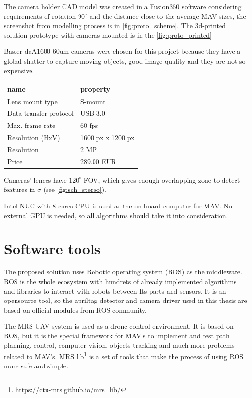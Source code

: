 The camera holder CAD model was created in a Fusion360 software considering requirements of rotation $90^\circ$ and the distance close to the average MAV sizes, the screenshot from modelling process is in \autoref{fig:proto_scheme}.
The 3d-printed solution prototype with cameras mounted is in the \autoref{fig:proto_printed}

Basler daA1600-60um cameras were chosen for this project because they have a global shutter to capture moving objects, good image quality and they are not so expensive.
\begin{center}
    \begin{tabular}{ l l }
    \hline
    name                   & property          \\ \hline
    Lens mount type        & S-mount           \\
    Data transfer protocol & USB 3.0           \\
    Max. frame rate        & 60 fps            \\
    Resolution (HxV)       & 1600 px x 1200 px \\
    Resolution             & 2 MP              \\
    Price                  & 289.00 EUR        \\ \hline
    \end{tabular}
\end{center}

Cameras' lences have $120^\circ$ FOV, which gives enough overlapping zone to detect features in $\sigma$ (see \autoref{fig:sch_stereo}).

Intel NUC with 8 cores CPU is used as the on-board computer for MAV. 
No external GPU is needed, so all algorithms should take it into consideration.

\section{Software tools}
\label{sec:impl_software}

The proposed solution uses Robotic operating system (ROS)\cite{Rospaper} as the middleware.
ROS is the whole ecosystem with hundrets of already implemented algorithms and libraries to interact with robots between Its parts and sensors.
It is an opensource tool, so the apriltag detector and camera driver used in this thesis are based on official modules from ROS community.

The MRS UAV system \cite{Baca2021} is used as a drone control environment. It is based on ROS, but it is the special framework for MAV's to implement and test path planning, control, computer vision, objects tracking and much more problems related to MAV's.
MRS lib\footnote{\url{https://ctu-mrs.github.io/mrs_lib/}} is a set of tools that make the process of using ROS more safe and simple.

